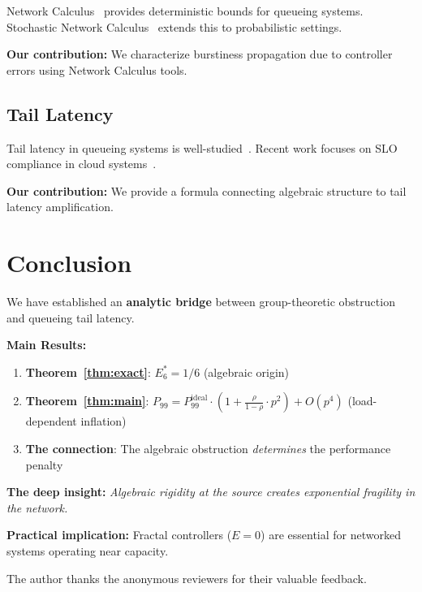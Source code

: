 \documentclass[11pt]{article}
\begin{document}
Network Calculus~\cite{cruz1991calculus,le2001network} provides deterministic bounds for queueing systems. Stochastic Network Calculus~\cite{jiang2003stochastic} extends this to probabilistic settings.

\textbf{Our contribution:} We characterize burstiness propagation due to controller errors using Network Calculus tools.

\subsection{Tail Latency}

Tail latency in queueing systems is well-studied~\cite{harchol2013performance}. Recent work focuses on SLO compliance in cloud systems~\cite{zhu2021snc}.

\textbf{Our contribution:} We provide a formula connecting algebraic structure to tail latency amplification.

\section{Conclusion}

We have established an \textbf{analytic bridge} between group-theoretic obstruction and queueing tail latency.

\textbf{Main Results:}
\begin{enumerate}
    \item \textbf{Theorem~\ref{thm:exact}}: $E_6^* = 1/6$ (algebraic origin)
    \item \textbf{Theorem~\ref{thm:main}}: $P_{99} = P_{99}^{\text{ideal}} \cdot (1 + \frac{\rho}{1-\rho} \cdot p^2) + O(p^4)$ (load-dependent inflation)
    \item \textbf{The connection}: The algebraic obstruction \textit{determines} the performance penalty
\end{enumerate}

\textbf{The deep insight:} \textit{Algebraic rigidity at the source creates exponential fragility in the network.}

\textbf{Practical implication:} Fractal controllers ($E = 0$) are essential for networked systems operating near capacity.

\begin{acks}
The author thanks the anonymous reviewers for their valuable feedback.
\end{acks}



\end{document}
